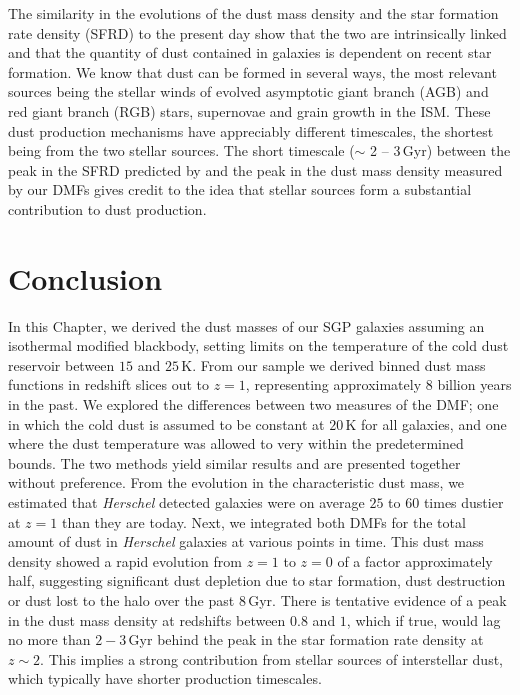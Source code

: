 The similarity in the evolutions of the dust mass density and the star formation rate density (SFRD) to the present day show that the two are intrinsically linked and that the quantity of dust contained in galaxies is dependent on recent star formation. We know that dust can be formed in several ways, the most relevant sources being the stellar winds of evolved asymptotic giant branch (AGB) and red giant branch (RGB) stars, supernovae and grain growth in the ISM. These dust production mechanisms have appreciably different timescales, the shortest being from the two stellar sources. The short timescale ($\sim$ 2 -- 3\,Gyr) between the peak in the SFRD predicted by \citealt{Madau_2014} and the peak in the dust mass density measured by our DMFs gives credit to the idea that stellar sources form a substantial contribution to dust production. 

\section{Conclusion}

In this Chapter, we derived the dust masses of our SGP galaxies assuming an isothermal modified blackbody, setting limits on the temperature of the cold dust reservoir between $15$ and $25\,$K. From our sample we derived binned dust mass functions in redshift slices out to $z = 1$, representing approximately $8$ billion years in the past. We explored the differences between two measures of the DMF; one in which the cold dust is assumed to be constant at $20\,$K for all galaxies, and one where the dust temperature was allowed to very within the predetermined bounds. The two methods yield similar results and are presented together without preference. From the evolution in the characteristic dust mass, we estimated that \textit{Herschel} detected galaxies were on average $25$ to $60$ times dustier at $z = 1$ than they are today. Next, we integrated both DMFs for the total amount of dust in \textit{Herschel} galaxies at various points in time. This dust mass density showed a rapid evolution from $z = 1$ to $z = 0$ of a factor approximately half, suggesting significant dust depletion due to star formation, dust destruction or dust lost to the halo over the past $8\,$Gyr. There is tentative evidence of a peak in the dust mass density at redshifts between $0.8$ and $1$, which if true, would lag no more than $2 - 3\,$Gyr behind the peak in the star formation rate density at $z \sim 2$. This implies a strong contribution from stellar sources of interstellar dust, which typically have shorter production timescales. 

